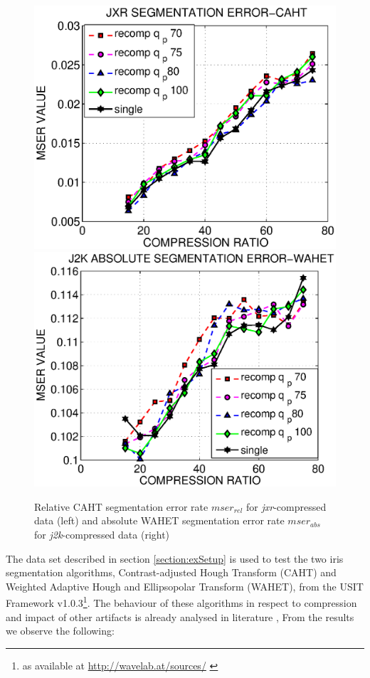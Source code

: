 \documentclass[10pt,twocolumn,letterpaper]{article}
\begin{document}
\begin{figure}
	\includegraphics[width=0.49\linewidth]{img/new/jxr_caht.eps}
	\includegraphics[width=0.49\linewidth]{img/new/j2k_abs_wahet.eps}	
	\caption{Relative CAHT segmentation error rate $mser_{rel}$ for \emph{jxr}-compressed data (left) and absolute WAHET segmentation error rate $mser_{abs}$ for \emph{j2k}-compressed data (right)}
	\label{fig:segResultsOther}
\end{figure}


The data set described in section \ref{section:exSetup} is used to test the two iris segmentation algorithms, Contrast-adjusted Hough Transform (CAHT) and Weighted Adaptive Hough and Ellipsopolar Transform (WAHET), from the USIT Framework v1.0.3\footnote{as available at \url{http://wavelab.at/sources/} \cite{Rathgeb12e}}.
The behaviour of these algorithms in respect to compression and impact of other artifacts is already analysed in literature \cite{severeCompression, debiasi14a}, 
From the results we observe the following:
\end{document}

